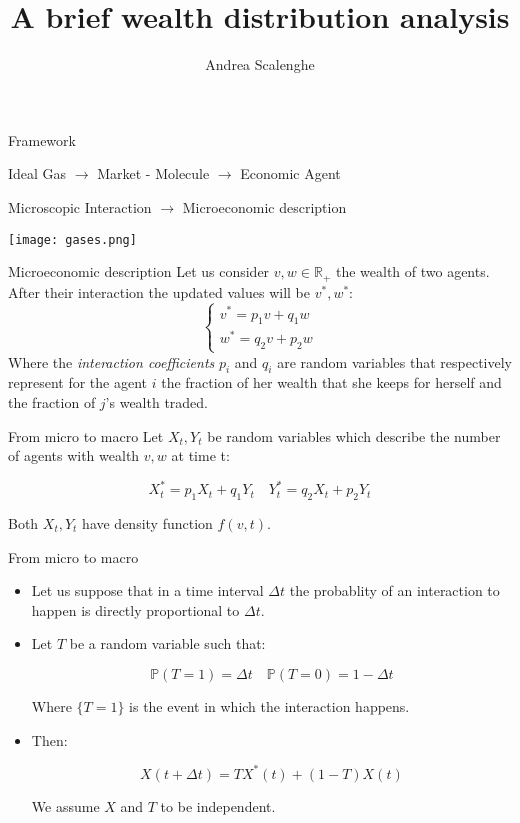 \documentclass[10pt, compress]{beamer}
\title{A brief wealth distribution analysis}
\subtitle{}
\author{Andrea Scalenghe}
\institute{Equazioni della Fisica Matematica}
\begin{document}
\maketitle

\begin{frame}{Framework}
    
    \begin{center}
        Ideal Gas $\rightarrow$ Market \quad - \quad Molecule $\rightarrow$ Economic Agent
    \end{center}
    \newline
    \begin{center}
        Microscopic Interaction $\rightarrow$ Microeconomic description
    \end{center}

    \texttt{[image: gases.png]}
    \centering

\end{frame}

\begin{frame}{Microeconomic description}
    Let us consider $v,w\in \mathbb{R}_+$ the wealth of two agents. After their interaction the updated values will be $v^{*},w^{*}$:
    \[\begin{cases}
v^{*}=p_1v+q_1w \\
w^{*}=q_2v+p_2w
\end{cases}\]
Where the \textit{interaction coefficients} $p_i$ and $q_i$ are random variables that respectively represent for the agent $i$ the fraction of her wealth that she keeps for herself and the fraction of $j$'s wealth traded.
\end{frame}

\begin{frame}{From micro to macro}
    Let $X_t,Y_t$ be random variables which describe the number of agents with wealth $v,w$ at time t:

    \[X^{*}_t=p_1X_t+q_1Y_t \quad Y^{*}_t=q_2X_t+p_2Y_t\]

    Both $X_t,Y_t$ have density function $f(v,t)$. 
\end{frame}

\begin{frame}{From micro to macro}
    \begin{itemize}
    
    \item Let us suppose that in a time interval $\Delta t$ the probablity of an interaction to happen is directly proportional to $\Delta t$.
    \item Let $T$ be a random variable such that:

    \[\mathbb{P}(T=1)=\Delta t \quad \mathbb{P}(T=0)=1-\Delta t\]

    Where $\{T=1\}$ is the event in which the interaction happens.
    
    \item Then:

    \[X(t+\Delta t)=TX^{*}(t)+(1-T)X(t)\]

    We assume $X$ and $T$ to be independent.
    \end{itemize}
\end{frame}
\end{document}
